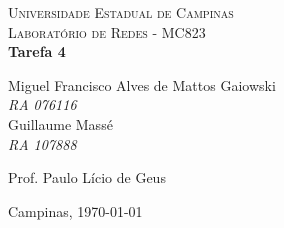 \begin{titlepage}

\newcommand{\HRule}{\rule{\linewidth}{0.5mm}} 
 
\begin{center}
 

\textsc{\LARGE Universidade Estadual de Campinas}\\[0.5cm]
\textsc{\Large Laboratório de Redes - MC823}
{\ }\\[4.5cm]
 
{ \huge \bfseries Tarefa 4}\\[3.0cm]
 
\begin{flushright}
Miguel Francisco Alves de Mattos Gaiowski \\
\emph{RA 076116} \\
Guillaume Massé\\
\emph{RA 107888} \\[2.0cm]


\end{flushright}


\begin{flushright}
Prof. Paulo Lício de Geus \\
\end{flushright}
 
\vfill
 
{\large Campinas, \today}
 
\end{center}
 
\end{titlepage}
